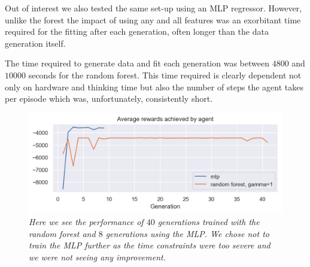 Out of interest we also tested the same set-up using an MLP regressor. However, unlike the forest the impact of using any and all features was an exorbitant time required for the fitting after each generation, often longer than the data generation itself.

The time required to generate data and fit each generation was between $4800$ and $10000$ seconds for the random forest. This time required is clearly dependent not only on hardware and thinking time but also the number of steps the agent takes per episode which was, unfortunately, consistently short.

\begin{figure}[!h]
\centering
	\includegraphics[width=\linewidth]{images/mlp_vs_forest_gamma_1.png}
	\caption{\textit{Here we see the performance of $40$ generations trained with the random forest and $8$ generations using the MLP. We chose not to train the MLP further as the time constraints were too severe and we were not seeing any improvement.}}
	\label{mlp_vs_forest_gamma_1.0}
\end{figure}


